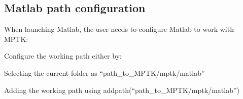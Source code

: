 
\subsection{Matlab path configuration}

When launching Matlab, the user needs to configure Matlab to work with MPTK:
\begin{my_itemize}
	\item Configure the working path either by: 
	\begin{my_itemize}
		\item Selecting the current folder as \textcolor[rgb]{0.4,0.4,0.4}{``path\_to\_MPTK/mptk/matlab''}
		\item Adding the working path using \textcolor[rgb]{0.4,0.4,0.4}{addpath(``path\_to\_MPTK/mptk/matlab'')}
	\end{my_itemize}
\end{my_itemize}
